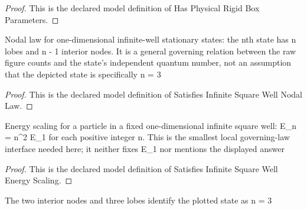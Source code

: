 \begin{proof}
  This is the declared model definition of Has Physical Rigid Box Parameters.
\end{proof}
\begin{definition}
  \label{def:physics:phyx-mini-0657:phyxminiproblems-problemphyxmini0657-satisfiesinfinitesquarewellnodallaw}
  Nodal law for one-dimensional infinite-well stationary states: the nth state has n lobes and n - 1 interior nodes. It is a general governing relation between the raw figure counts and the state's independent quantum number, not an assumption that the depicted state is specifically n = 3
\end{definition}
\begin{proof}
  This is the declared model definition of Satisfies Infinite Square Well Nodal Law.
\end{proof}
\begin{definition}
  \label{def:physics:phyx-mini-0657:phyxminiproblems-problemphyxmini0657-satisfiesinfinitesquarewellenergyscaling}
  Energy scaling for a particle in a fixed one-dimensional infinite square well: E\_n = n\textasciicircum{}2 E\_1 for each positive integer n. This is the smallest local governing-law interface needed here; it neither fixes E\_1 nor mentions the displayed answer
\end{definition}
\begin{proof}
  This is the declared model definition of Satisfies Infinite Square Well Energy Scaling.
\end{proof}
\begin{lemma}
  \label{lem:physics:phyx-mini-0657:phyxminiproblems-problemphyxmini0657-suppliedfigure-depicts-thirdstationarystate}
  The two interior nodes and three lobes identify the plotted state as n = 3
\end{lemma}
